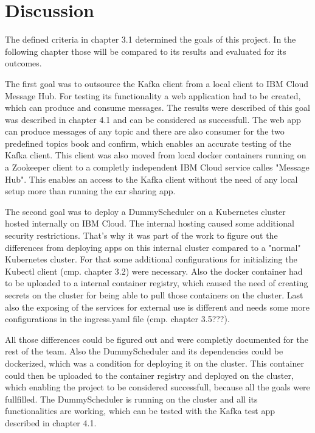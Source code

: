 
\chapter{Discussion}

The defined criteria in chapter 3.1 determined the goals of this project. In the following chapter those will be compared to its results and evaluated for its outcomes.

The first goal was to outsource the Kafka client from a local client to IBM Cloud Message Hub. For testing its functionality a web application had to be created, which can produce and consume messages. The results were described of this goal was described in chapter 4.1 and can be considered as successfull. The web app can produce messages of any topic and there are also consumer for the two predefined topics book and confirm, which enables an accurate testing of the Kafka client. This client was also moved from local docker containers running on a Zookeeper client to a completly independent IBM Cloud service calles "Message Hub". This enables an access to the Kafka client without the need of any local setup more than running the car sharing app.

The second goal was to deploy a DummyScheduler on a Kubernetes cluster hosted internally on IBM Cloud. The internal hosting caused some additional security restrictions. That's why it was part of the work to figure out the differences from deploying apps on this internal cluster compared to a "normal" Kubernetes cluster. For that some additional configurations for initializing the Kubectl client (cmp. chapter 3.2) were necessary. Also the docker container had to be uploaded to a internal container registry, which caused the need of creating secrets on the cluster for being able to pull those containers on the cluster. Last also the exposing of the services for external use is different and needs some more configurations in the ingress.yaml file (cmp. chapter 3.5???). 

All those differences could be figured out and were completly documented for the rest of the team. Also the DummyScheduler and its dependencies could be dockerized, which was a condition for deploying it on the cluster. This container could then be uploaded to the container registry and deployed on the cluster, which enabling the project to be considered successfull, because all the goals were fullfilled. The DummyScheduler is running on the cluster and all its functionalities are working, which can be tested with the Kafka test app described in chapter 4.1. 

